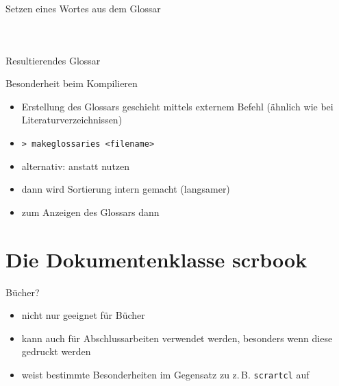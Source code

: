 \documentclass[presentation,aspectratio=169]{beamer}
\begin{document}
\begin{frame}[fragile]{Setzen eines Wortes aus dem Glossar}
  \begin{columns}
    \begin{column}{.49\textwidth}
      
    \end{column}
    \begin{column}{.5\textwidth}
      \inputminted{latex}{codebeispiele/glossaries-usage.tex}
    \end{column}
  \end{columns}
\end{frame}

\begin{frame}{Resultierendes Glossar}
  \printglossary
\end{frame}

\begin{frame}[fragile]{Besonderheit beim Kompilieren}
  \begin{itemize}
    \item Erstellung des Glossars geschieht mittels externem Befehl (ähnlich wie bei Literaturverzeichnissen)
    \item \verb|> makeglossaries <filename>|
    \vspace{1em}
    \item alternativ: anstatt   nutzen
    \item dann wird Sortierung intern gemacht (langsamer)
    \item zum Anzeigen des Glossars dann 
  \end{itemize}
\end{frame}

\section{Die Dokumentenklasse scrbook}

\begin{frame}[fragile]{Bücher?}
  \begin{itemize}
    \item nicht nur geeignet für Bücher
    \item kann auch für Abschlussarbeiten verwendet werden, besonders wenn diese gedruckt werden
    \item weist bestimmte Besonderheiten im Gegensatz zu z.\,B. \verb|scrartcl| auf
  \end{itemize}
\end{frame}
\end{document}
